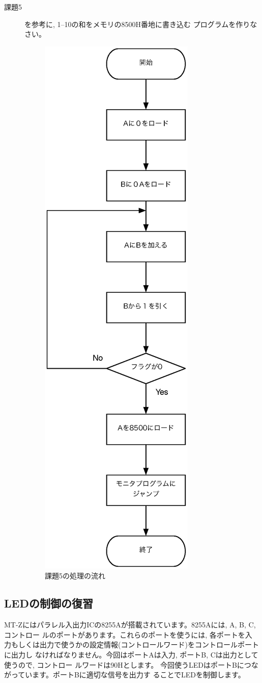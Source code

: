 \begin{description}
\item[課題5] を参考に, 1--10の和をメモリの8500H番地に書き込む
           プログラムを作りなさい。

\begin{figure}[htbp]
\begin{center}
\includegraphics[width=0.2\linewidth]{img/flow2.eps}
\caption{課題5の処理の流れ}
\label{fig:flow2}
\end{center}
\end{figure}
\end{description}

\newpage

\subsection{LEDの制御の復習}

MT-Zにはパラレル入出力ICの8255Aが搭載されています。8255Aには, A, B, C, コントロー
ルのポートがあります。これらのポートを使うには, 各ポートを入
力もしくは出力で使うかの設定情報(コントロールワード)をコントロールポートに出力し
なければなりません。今回はポートAは入力, ポートB, Cは出力として使うので, コントロー
ルワードは90Hとします。
今回使うLEDはポートBにつながっています。ポートBに適切な信号を出力す
ることでLEDを制御します。

